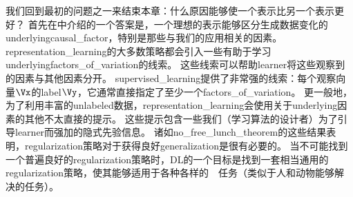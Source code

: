 
我们回到最初的问题之一来结束本章：什么原因能够使一个表示比另一个表示更好？
首先在中介绍的一个答案是，一个理想的表示能够区分生成数据变化的\gls{underlying}\gls{causal_factor}，特别是那些与我们的应用相关的因素。
\gls{representation_learning}的大多数策略都会引入一些有助于学习\gls{underlying}\gls{factors_of_variation}的线索。
这些线索可以帮助\gls{learner}将这些观察到的因素与其他因素分开。
\gls{supervised_learning}提供了非常强的线索：每个观察向量$\Vx$的\gls{label}$\Vy$，它通常直接指定了至少一个\gls{factors_of_variation}。
更一般地，为了利用丰富的\gls{unlabeled}数据，\gls{representation_learning}会使用关于\gls{underlying}因素的其他不太直接的提示。
这些提示包含一些我们（学习算法的设计者）为了引导\gls{learner}而强加的隐式先验信息。
诸如\gls{no_free_lunch_theorem}的这些结果表明，\gls{regularization}策略对于获得良好\gls{generalization}是很有必要的。
当不可能找到一个普遍良好的\gls{regularization}策略时，\gls{DL}的一个目标是找到一套相当通用的\gls{regularization}策略，使其能够适用于各种各样的~~任务（类似于人和动物能够解决的任务）。


